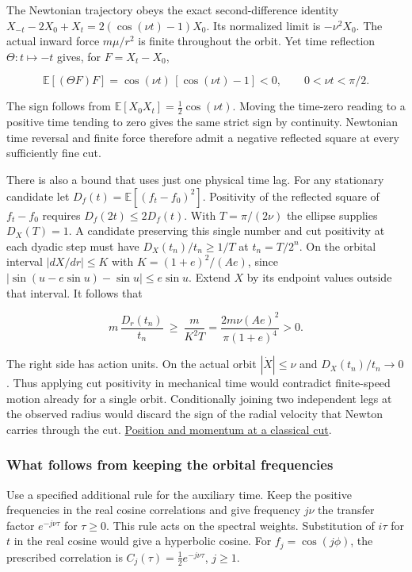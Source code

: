 \documentclass[11pt,a4paper]{article}
\begin{document}
The Newtonian trajectory obeys the exact second-difference identity
\(X_{-t}-2X_0+X_t=2(\cos(\nu t)-1)X_0\). Its normalized limit is
\(-\nu^2X_0\). The actual inward force \(m\mu/r^2\) is finite throughout
the orbit. Yet time reflection \(\Theta:t\mapsto-t\) gives, for
\(F=X_t-X_0\),

\[
 \mathbb E[(\Theta F)F]=\cos(\nu t)\,[\cos(\nu t)-1]<0,
 \qquad 0<\nu t<\pi/2 .                                           \tag{10}
\]

The sign follows from \(\mathbb E[X_0X_t]=\tfrac12\cos(\nu t)\). Moving
the time-zero reading to a positive time tending to zero gives the same
strict sign by continuity. Newtonian time reversal and finite force
therefore admit a negative reflected square at every sufficiently fine
cut.

There is also a bound that uses just one physical time lag. For any
stationary candidate let \(D_f(t)=\mathbb E[(f_t-f_0)^2]\). Positivity
of the reflected square of \(f_t-f_0\) requires \(D_f(2t)\le2D_f(t)\).
With \(T=\pi/(2\nu)\) the ellipse supplies \(D_X(T)=1\). A candidate
preserving this single number and cut positivity at each dyadic step
must have \(D_X(t_n)/t_n\ge1/T\) at \(t_n=T/2^n\). On the orbital
interval \(|dX/dr|\le K\) with \(K=(1+e)^2/(Ae)\), since
\(|\sin(u-e\sin u)-\sin u|\le e\sin u\). Extend \(X\) by its endpoint
values outside that interval. It follows that

\[
 m\,\frac{D_r(t_n)}{t_n}\ \ge\ \frac{m}{K^2T}
 =\frac{2m\nu(Ae)^2}{\pi(1+e)^4}>0 .
\]

The right side has action units. On the actual orbit \(|\dot X|\le\nu\)
and \(D_X(t_n)/t_n\to0\). Thus applying cut positivity in mechanical
time would contradict finite-speed motion already for a single orbit.
Conditionally joining two independent legs at the observed radius would
discard the sign of the radial velocity that Newton carries through the
cut.
\href{conservative-harmonic-receiver.md\#8-what-information-survives-a-cut}{Position
and momentum at a classical cut}.

\subsubsection{What follows from keeping the orbital
frequencies}\label{what-follows-from-keeping-the-orbital-frequencies}

Use a specified additional rule for the auxiliary time. Keep the
positive frequencies in the real cosine correlations and give frequency
\(j\nu\) the transfer factor \(e^{-j\nu\tau}\) for \(\tau\ge0\). This
rule acts on the spectral weights. Substitution of \(i\tau\) for \(t\)
in the real cosine would give a hyperbolic cosine. For
\(f_j=\cos(j\phi)\), the prescribed correlation is
\(C_j(\tau)=\tfrac12e^{-j\nu\tau}\), \(j\ge1\).
\end{document}
